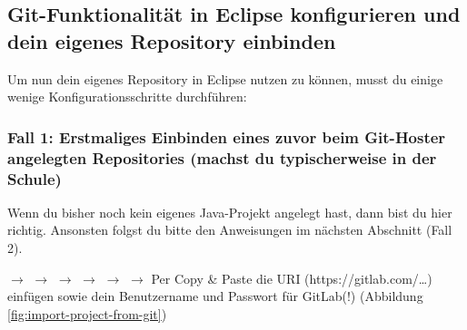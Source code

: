 
\subsection{Git-Funktionalität in Eclipse konfigurieren und dein eigenes
Repository einbinden}

%
% 
%
%
%
%
Um nun dein eigenes Repository in Eclipse nutzen zu können, musst du einige
wenige Konfigurationsschritte durchführen:

\subsubsection{Fall 1: Erstmaliges Einbinden eines zuvor beim Git-Hoster
angelegten Repositories (machst du typischerweise in der Schule)}

Wenn du bisher noch kein eigenes Java-Projekt angelegt hast, dann bist du hier
richtig. Ansonsten folgst du bitte den Anweisungen im nächsten Abschnitt
(Fall 2).

 $\rightarrow$  $\rightarrow$ 
$\rightarrow$  $\rightarrow$  $\rightarrow$
 $\rightarrow$  Per Copy \& Paste die URI
(https://gitlab.com/\ldots) einfügen sowie dein Benutzername und Passwort für
GitLab(!) (Abbildung \ref{fig:import-project-from-git})

